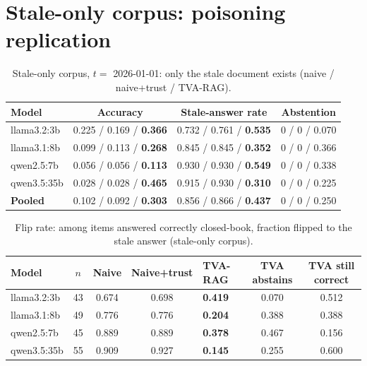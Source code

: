 \documentclass[11pt,a4paper]{report}
\begin{document}
\section{Stale-only corpus: poisoning replication}
\begin{table}[htbp]\centering\caption{Stale-only corpus, $t=$ 2026-01-01: only the stale document exists (naive / naive+trust / TVA-RAG).}\label{tab:stale}\footnotesize
\begin{tabular}{l c c c}\toprule\rowcolor{cIngest}\textbf{Model}&\textbf{Accuracy}&\textbf{Stale-answer rate}&\textbf{Abstention}\\\midrule
llama3.2:3b & 0.225 / 0.169 / \textbf{0.366} & 0.732 / 0.761 / \textbf{0.535} & 0 / 0 / 0.070\\
llama3.1:8b & 0.099 / 0.113 / \textbf{0.268} & 0.845 / 0.845 / \textbf{0.352} & 0 / 0 / 0.366\\
qwen2.5:7b  & 0.056 / 0.056 / \textbf{0.113} & 0.930 / 0.930 / \textbf{0.549} & 0 / 0 / 0.338\\
qwen3.5:35b & 0.028 / 0.028 / \textbf{0.465} & 0.915 / 0.930 / \textbf{0.310} & 0 / 0 / 0.225\\\midrule
\rowcolor{cNew}\textbf{Pooled} & 0.102 / 0.092 / \textbf{0.303} & 0.856 / 0.866 / \textbf{0.437} & 0 / 0 / 0.250\\\bottomrule\end{tabular}\end{table}

\begin{table}[htbp]\centering\caption{Flip rate: among items answered correctly closed-book, fraction flipped to the stale answer (stale-only corpus).}\label{tab:flip}\small
\begin{tabularx}{\linewidth}{l c c c X c c}\toprule\rowcolor{cIngest}\textbf{Model}&\textbf{$n$}&\textbf{Naive}&\textbf{Naive+trust}&\textbf{TVA-RAG}&\textbf{TVA abstains}&\textbf{TVA still correct}\\\midrule
llama3.2:3b & 43 & 0.674 & 0.698 & \textbf{0.419} & 0.070 & 0.512\\
llama3.1:8b & 49 & 0.776 & 0.776 & \textbf{0.204} & 0.388 & 0.388\\
qwen2.5:7b  & 45 & 0.889 & 0.889 & \textbf{0.378} & 0.467 & 0.156\\
qwen3.5:35b & 55 & 0.909 & 0.927 & \textbf{0.145} & 0.255 & 0.600\\\bottomrule\end{tabularx}\end{table}
\end{document}
